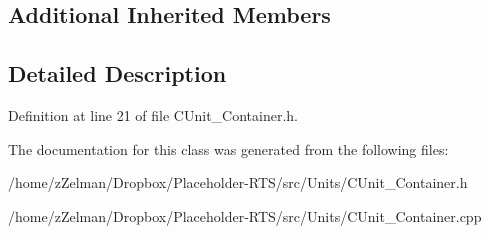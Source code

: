 \subsection*{Additional Inherited Members}


\subsection{Detailed Description}


Definition at line 21 of file C\-Unit\-\_\-\-Container.\-h.



The documentation for this class was generated from the following files\-:\begin{DoxyCompactItemize}
\item 
/home/z\-Zelman/\-Dropbox/\-Placeholder-\/\-R\-T\-S/src/\-Units/C\-Unit\-\_\-\-Container.\-h\item 
/home/z\-Zelman/\-Dropbox/\-Placeholder-\/\-R\-T\-S/src/\-Units/C\-Unit\-\_\-\-Container.\-cpp\end{DoxyCompactItemize}
